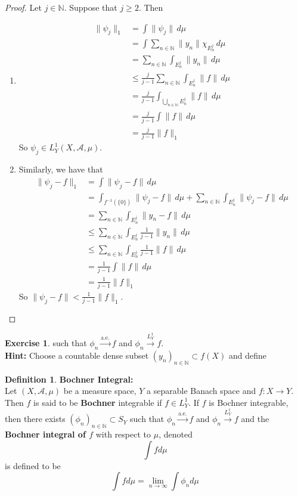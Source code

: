 \documentclass[12pt]{amsart}
\theoremstyle{definition}
\newtheorem{defn}[definition]{Definition}
\newtheorem{ex}[definition]{Exercise}
\newcommand{\N}{\mathbb{N}}
\newcommand{\MA}{\mathcal{A}}
\newcommand{\dmu}{\, d \mu}
\newcommand{\limn}{\lim \limits_{n \rightarrow \infty}}
\newcommand{\convt}[1]{\xrightarrow{\text{#1}}}
\newcommand{\conv}[1]{\xrightarrow{#1}}
\newcommand{\ld}[1]{\label{defn:#1}}
\begin{document}
	\begin{proof}	
	Let $j \in \N$. 
	Suppose that $j \geq 2$. Then 
	\begin{enumerate}
		\item \begin{align*}
			\|\psi_j\|_1 
			& = \int \|\psi_j\| \dmu \\
			& = \int \sum_{n \in \N} \|y_n\| \chi_{E_n^j} \dmu \\
			& =  \sum_{n \in \N} \int_{E_n^j} \|y_n\| \dmu \\
			& \leq \frac{j}{j-1} \sum_{n \in \N} \int_{E_n^j} \|f\| \dmu \\
			& = \frac{j}{j-1} \int_{\bigcup\limits_{n \in \N} E_n^j} \|f\| \dmu \\
			& = \frac{j}{j-1} \int \|f\| \dmu \\
			& = \frac{j}{j-1} \|f\|_1
		\end{align*}
		So $\psi_j \in L^1_Y(X, \MA, \mu)$. 
		\item Similarly, we have that
		\begin{align*}
			\|\psi_j - f\|_1 
			& = \int \|\psi_j - f\| \dmu \\
			& = \int_{f^{-1}(\{0\})} \|\psi_j - f\| \dmu +  \sum_{n \in \N} \int_{E_n^j} \|\psi_j - f\| \dmu \\
			& = \sum_{n \in \N} \int_{E_n^j} \|y_n - f\| \dmu \\
			& \leq  \sum_{n \in \N} \int_{E_n^j}  \frac{1}{j - 1} \|y_n\| \dmu \\
			& \leq  \sum_{n \in \N} \int_{E_n^j}  \frac{1}{j - 1} \|f\| \dmu \\
			& =  \frac{1}{j - 1} \int \|f\| \dmu \\
			& =  \frac{1}{j - 1} \|f\|_1
		\end{align*}
		So $\|\psi_j - f\| < \frac{1}{j - 1} \|f\|_1$.
	\end{enumerate}
	\end{proof}	

	\begin{ex}
		such that $\phi_n \convt{a.e.} f$ and $\phi_n \conv{L_Y^1} f$.\\
		\textbf{Hint:} Choose a countable dense subset $(y_n)_{n \in \N} \subset f(X)$ and define 
	\end{ex}	
	
	\begin{defn} \ld{00000} \textbf{Bochner Integral:}\\
	Let $(X, \MA, \mu)$ be a measure space, $Y$ a separable Banach space and $f:X \rightarrow Y$. Then $f$ is said to be \textbf{Bochner} integrable if $f \in L^1_Y$. If $f$ is Bochner integrable, then there exists $(\phi_n)_{n \in \N} \subset S_Y$ such that $\phi_n \convt{a.e.} f$ and $\phi_n \conv{L_Y^1} f$ and the \textbf{Bochner integral of $f$} with respect to $\mu$, denoted $$\int f d\mu$$ is defined to be $$\int f d\mu = \limn \int \phi_n d\mu$$ 
	\end{defn}
	
\end{document}
